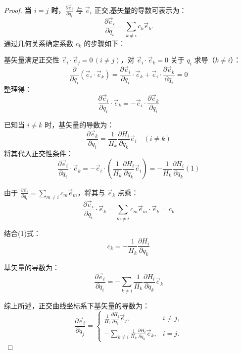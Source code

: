 \documentclass[12pt, a4paper, oneside, UTF8]{ctexbook}  %
\begin{document}
\begin{proposition}
\begin{proof}
    \textbf{当 \( i = j \) 时}，\( \frac{\partial \vec{e}_i}{\partial q_i} \) 与 \( \vec{e}_i \) 正交,基矢量的导数可表示为：
\[
\frac{\partial \vec{e}_i}{\partial q_i} = \sum_{k \neq i} c_k \vec{e}_k.
\]
    通过几何关系确定系数 \( c_k \) 的步骤如下：

    基矢量满足正交性 \( \vec{e}_i \cdot \vec{e}_j = 0 \, (i \neq j) \)，对 \( \vec{e}_i \cdot \vec{e}_k = 0 \) 关于 \( q_i \) 求导（\( k \neq i \)）：
    \[
    \frac{\partial}{\partial q_i} (\vec{e}_i \cdot \vec{e}_k) = \frac{\partial \vec{e}_i}{\partial q_i} \cdot \vec{e}_k + \vec{e}_i \cdot \frac{\partial \vec{e}_k}{\partial q_i} = 0
    \]
    整理得：
    \[
    \frac{\partial \vec{e}_i}{\partial q_i} \cdot \vec{e}_k = -\vec{e}_i \cdot \frac{\partial \vec{e}_k}{\partial q_i}
    \]
    
    已知当 \( i \neq k \) 时，基矢量的导数为：
    \[
    \frac{\partial \vec{e}_k}{\partial q_i} = \frac{1}{H_k} \frac{\partial H_i}{\partial q_k} \vec{e}_i \quad (i \neq k)
    \]
    将其代入正交性条件：
    \[
    \frac{\partial \vec{e}_i}{\partial q_i} \cdot \vec{e}_k = -\vec{e}_i \cdot \left( \frac{1}{H_k} \frac{\partial H_i}{\partial q_k} \vec{e}_i \right) = -\frac{1}{H_k} \frac{\partial H_i}{\partial q_k} (1)
    \]

    由于 \( \frac{\partial \vec{e}_i}{\partial q_i} = \sum_{m \neq i} c_m \vec{e}_m \)，将其与 \( \vec{e}_k \) 点乘：
    \[
    \frac{\partial \vec{e}_i}{\partial q_i} \cdot \vec{e}_k = \sum_{m \neq i} c_m \vec{e}_m \cdot \vec{e}_k = c_k
    \]
    
    结合(1)式：
    \[
    c_k = -\frac{1}{H_k} \frac{\partial H_i}{\partial q_k}
    \]
    
    基矢量的导数为：
    \[
    \frac{\partial \vec{e}_i}{\partial q_i} = -\sum_{k \neq i} \frac{1}{H_k} \frac{\partial H_i}{\partial q_k} \vec{e}_k
    \]

    综上所述，正交曲线坐标系下基矢量的导数为：
    \[
    \frac{\partial \vec{e}_i}{\partial q_j} = 
    \begin{cases}
    \frac{1}{H_i} \frac{\partial H_j}{\partial q_i} \vec{e}_j, & i \neq j, \\
    -\sum_{k \neq i} \frac{1}{H_k} \frac{\partial H_i}{\partial q_k} \vec{e}_k, & i = j.
    \end{cases}
    \]
\end{proof}
\end{proposition}
\end{document}
